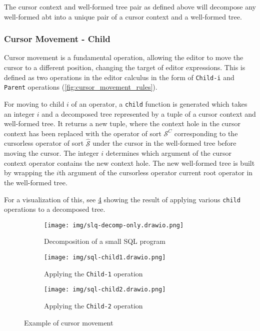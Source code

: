 \documentclass[sigplan]{acmart}
\newcommand{\abt}{\textsf{abt}\xspace}
\begin{document}
The cursor context and well-formed tree pair as defined above will decompose
any well-formed \abt into a unique pair of a cursor context and a well-formed tree.

\subsubsection{Cursor Movement - Child}
Cursor movement is a fundamental operation, allowing the editor to move the cursor
to a different position, changing the target of editor expressions. This is defined
as two operations in the editor calculus in the form of
\texttt{Child-i} and \texttt{Parent} operations (\cref{fig:cursor_movement_rules}).

For moving to child $i$ of an operator, a \texttt{child} function is generated
which takes an integer $i$ and a decomposed tree represented by a tuple of a cursor
context and well-formed tree. It returns a new tuple, where the context hole in
the cursor context has been replaced with the operator of sort $\mathcal{S}^C$ corresponding to the cursorless
operator of sort $\hat{\mathcal{S}}$ under the cursor in the well-formed tree before
moving the cursor. The integer $i$ determines which argument of the cursor context
operator contains the new context hole. The new well-formed tree is built by
wrapping the $i$th argument of the cursorless operator current root operator
in the well-formed tree.

For a visualization of this, see \cref{fig:movement-example} showing the result
of applying various \texttt{child} operations to a decomposed tree.

\begin{figure}[h]
  \centering
  \begin{subfigure}[b]{0.9\linewidth}
    \centering
    \texttt{[image: img/slq-decomp-only.drawio.png]}
    \caption{Decomposition of a small SQL program}
    \label{subfig:decomp-only}
  \end{subfigure}
  \hfill
  \begin{subfigure}[b]{0.9\linewidth}
    \centering
    \texttt{[image: img/sql-child1.drawio.png]}
    \caption{Applying the \texttt{Child-1} operation}
    \label{subfig:child1}
  \end{subfigure}
  \hfill
  \begin{subfigure}[b]{0.9\linewidth}
    \centering
    \texttt{[image: img/sql-child2.drawio.png]}
    \caption{Applying the \texttt{Child-2} operation}
    \label{subfig:child2}
  \end{subfigure}
  \caption{Example of cursor movement}
  \label{fig:movement-example}
\end{figure}
\end{document}

